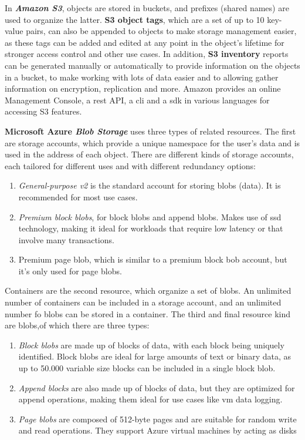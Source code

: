 In\textit{ \textbf{Amazon S3}}, objects are stored in buckets, and prefixes (shared names) are used to organize the latter. \textbf{S3 object tags}, which are a set of up to 10 key-value pairs, can also be appended to objects to make storage management easier, as these tags can be added and edited at any point in the object's lifetime for stronger access control and other use cases. In addition, \textbf{S3 inventory} reports can be generated manually or automatically to provide information on the objects in a bucket, to make working with lots of data easier and to allowing gather information on encryption, replication and more. Amazon provides an online Management Console, a \ac{rest} API, a \ac{cli} and a \ac{sdk} in various languages  for accessing S3 features. \cite{s3faq}

\textbf{Microsoft Azure \textit{\textbf{Blob Storage}}} uses three types of related resources. The first are storage accounts, which provide a unique namespace for the user's data and is used in the address of each object. There are different kinds of storage accounts, each tailored for different uses and with different redundancy options: \cite{blobaccounts}

\begin{enumerate}
	\item \textit{General-purpose v2} is the standard account for storing blobs (data). It is recommended for most use cases.
	
	\item \textit{Premium block blobs}, for block blobs and append blobs. Makes use of \ac{ssd} technology, making it ideal for workloads that require low latency or that involve many transactions.
	
	\item Premium page blob, which is similar to a  premium block bob account, but it's only used for page blobs.
\end{enumerate}

Containers are the second resource, which organize a set of blobs. An unlimited number of containers can be included in a storage account, and an unlimited number fo blobs can be stored in a container. The third and final resource kind are blobs,of which there are three types:

\begin{enumerate}
	\item \textit{Block blobs} are made up of blocks of data, with each block being uniquely identified. Block blobs are ideal for large amounts of text or binary data, as up to 50.000 variable size blocks can be included in a single block blob.
	
	\item \textit{Append blocks} are also made up of blocks of data, but they are optimized for append operations, making them ideal for use cases like \ac{vm} data logging.
	
	\item \textit{Page blobs}  are composed of 512-byte pages and are suitable for random write and read operations. They support Azure virtual machines by acting as disks
\end{enumerate}


